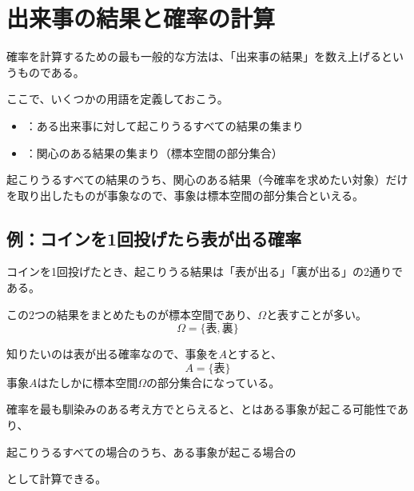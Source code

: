 \documentclass[../../../topic_statistics]{subfiles}
\begin{document}
\sectionline
\section{出来事の結果と確率の計算}

確率を計算するための最も一般的な方法は、「出来事の結果」を数え上げるというものである。

\br

ここで、いくつかの用語を定義しておこう。

\begin{itemize}
  \item {}：ある出来事に対して起こりうるすべての結果の集まり
  \item {}：関心のある結果の集まり（標本空間の部分集合）
\end{itemize}

起こりうるすべての結果のうち、関心のある結果（今確率を求めたい対象）だけを取り出したものが事象なので、事象は標本空間の部分集合といえる。

\subsection{例：コインを1回投げたら表が出る確率}

コインを1回投げたとき、起こりうる結果は「表が出る」「裏が出る」の2通りである。

この2つの結果をまとめたものが標本空間であり、$\Omega$と表すことが多い。
\begin{equation*}
  \Omega = \{ \text{表}, \text{裏} \}
\end{equation*}

知りたいのは表が出る確率なので、事象を$A$とすると、
\begin{equation*}
  A = \{ \text{表} \}
\end{equation*}
事象$A$はたしかに標本空間$\Omega$の部分集合になっている。

\br

確率を最も馴染みのある考え方でとらえると、とはある事象が起こる可能性であり、
\begin{emphabox}
  \begin{spacebox}
    \begin{center}
      起こりうるすべての場合のうち、ある事象が起こる場合の
    \end{center}
  \end{spacebox}
\end{emphabox}
として計算できる。
\end{document}
